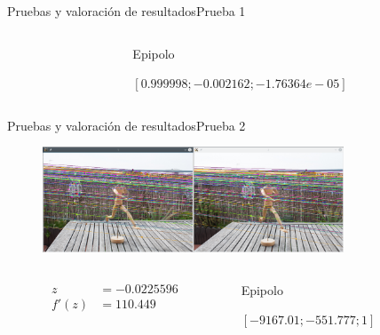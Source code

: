 \documentclass[aspectratio=169,14pt,spanish]{beamer}
\begin{document}
\begin{frame}{Pruebas y valoración de resultados}{Prueba 1}
\begin{overlayarea}{\textwidth}{8cm}
{\begin{columns}
\begin{column}{0.2\textwidth}
                \end{column}
                \begin{column}{0.8\textwidth}
                  Epipolo

                  $[0.999998; -0.002162; -1.76364e-05]$
                \end{column}
              \end{columns}

              }

          \end{overlayarea}
      \end{frame}

      \begin{frame}{Pruebas y valoración de resultados}{Prueba 2}
        \begin{overlayarea}{\textwidth}{8cm}
             {\begin{figure}[ht!]
              \centering
              \includegraphics[width=0.8\textwidth]{../Informe/Monigote-Normal.png}
            \end{figure}

            \begin{columns}
              \begin{column}{0.2\textwidth}
                \begin{align*}
                  z &= -0.0225596 \\
                  f'(z) &= 110.449
                \end{align*}
              \end{column}
              \begin{column}{0.8\textwidth}
                Epipolo

                $[-9167.01; -551.777; 1]$
              \end{column}
            \end{columns}


            }
\end{overlayarea}
\end{frame}
\end{document}
